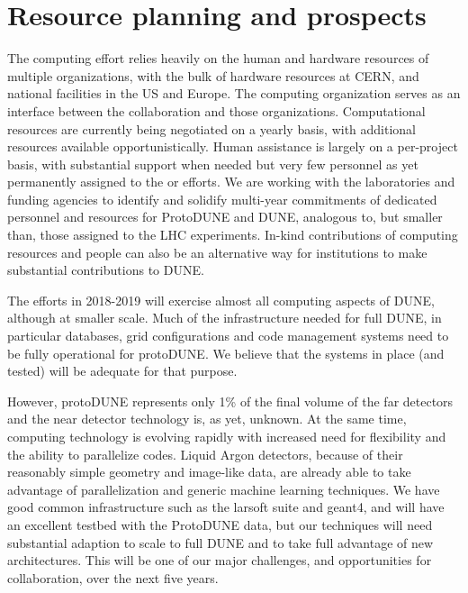 \section{Resource planning and prospects}



The   computing effort  relies heavily on the human and hardware resources of  multiple organizations,  with the bulk of hardware resources at CERN, and national facilities in the US and Europe.  The    computing organization serves as an interface between the collaboration and those organizations.  Computational resources are currently being negotiated on a yearly basis, with additional resources available opportunistically. Human assistance is largely on a per-project  basis, with substantial support when needed but very few personnel as yet permanently assigned to the   or  efforts.  We are working with the laboratories and funding agencies to identify and solidify multi-year commitments of dedicated personnel and resources for ProtoDUNE and DUNE, analogous to, but smaller than, those assigned to the LHC experiments.   In-kind contributions of computing resources and people can also  be an alternative way for institutions to make substantial contributions to DUNE.

The  efforts in 2018-2019 will exercise almost all computing aspects of DUNE, although at smaller scale.  Much of the infrastructure needed for full DUNE, in particular  databases, grid configurations and code management systems need to be fully operational  for protoDUNE.   We believe that the systems in place (and tested) will be adequate for that purpose.

However, protoDUNE represents only 1\% of the final volume of the far detectors and the near detector technology is, as yet, unknown.  At the same time, computing technology is evolving rapidly with increased need for flexibility and the ability to parallelize codes.  Liquid Argon detectors, because of their reasonably simple geometry and image-like data, are already able to take advantage of parallelization and generic machine learning techniques.  We have good common infrastructure such as the larsoft suite and geant4, and will have an excellent testbed with the ProtoDUNE data,  but our techniques will need substantial adaption to scale to full DUNE and to take full advantage of new architectures.  This will be one of our major challenges, and opportunities for collaboration,  over the next five years.

